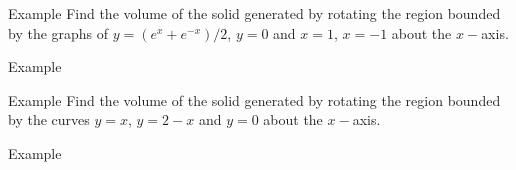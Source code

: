 \documentclass[presentation]{beamer}
\begin{document}
\begin{frame}[label={sec:orge37fcac}]{Example}
Find the volume of the solid generated by rotating the region bounded
by the graphs of \(y = \left( e^x + e^{-x} \right)/2\), \(y = 0\)
and \(x = 1\), \(x = -1\) about the \(x-\)axis.
\vspace{10in}
\end{frame}

\begin{frame}[label={sec:org02620b0}]{Example}
\end{frame}

\begin{frame}[label={sec:org6409873}]{Example}
Find the volume of the solid generated by rotating the region bounded
by the curves \(y = x\), \(y = 2-x\) and \(y = 0\) about the \(x-\)axis.
\vspace{10in}
\end{frame}

\begin{frame}[label={sec:orgddc9d00}]{Example}
\end{frame}
\end{document}
